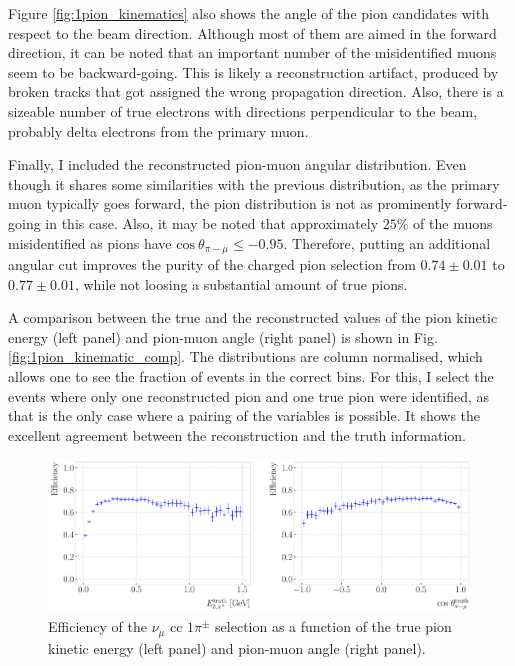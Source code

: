 Figure \ref{fig:1pion_kinematics} also shows the angle of the pion candidates with respect to the beam direction. Although most of them are aimed in the forward direction, it can be noted that an important number of the misidentified muons seem to be backward-going. This is likely a reconstruction artifact, produced by broken tracks that got assigned the wrong propagation direction. Also, there is a sizeable number of true electrons with directions perpendicular to the beam, probably delta electrons from the primary muon.

Finally, I included the reconstructed pion-muon angular distribution. Even though it shares some similarities with the previous distribution, as the primary muon typically goes forward, the pion distribution is not as prominently forward-going in this case. Also, it may be noted that approximately $25\%$ of the muons misidentified as pions have $\mathrm{cos}~\theta_{\pi - \mu} \leq -0.95$. Therefore, putting an additional angular cut improves the purity of the charged pion selection from $0.74 \pm 0.01$ to $0.77 \pm 0.01$, while not loosing a substantial amount of true pions.

A comparison between the true and the reconstructed values of the pion kinetic energy (left panel) and pion-muon angle (right panel) is shown in Fig. \ref{fig:1pion_kinematic_comp}. The distributions are column normalised, which allows one to see the fraction of events in the correct bins. For this, I select the events where only one reconstructed pion and one true pion were identified, as that is the only case where a pairing of the variables is possible. It shows the excellent agreement between the reconstruction and the truth information.

\begin{figure}[t]
    \centering
    \includegraphics[width=.99\linewidth]{Images/GAr_selection/pion_selection_1pion_kin_efficiency.pdf}
    \caption[Efficiency of the $\nu_{\mu}$ \gls{cc} $1\pi^{\pm}$ selection as a function of the true pion kinetic energy and pion-muon angle.]{Efficiency of the $\nu_{\mu}$ \gls{cc} $1\pi^{\pm}$ selection as a function of the true pion kinetic energy (left panel) and pion-muon angle (right panel).}
    \label{fig:1pion_kin_efficiency}
\end{figure}

